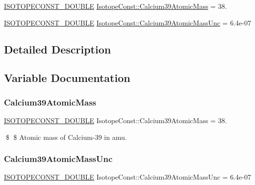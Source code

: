 \begin{DoxyCompactItemize}
\item 
\mbox{\hyperlink{group___isotope_const-_macros_ga8f45a7272ce02c0b4c65c44636ed719a}{I\+S\+O\+T\+O\+P\+E\+C\+O\+N\+S\+T\+\_\+\+D\+O\+U\+B\+LE}} \mbox{\hyperlink{group___isotope_const-_calcium-_ca39_ga70c11fbb9c2a9befa8720db8d4707d75}{Isotope\+Const\+::\+Calcium39\+Atomic\+Mass}} = 38.
\item 
\mbox{\hyperlink{group___isotope_const-_macros_ga8f45a7272ce02c0b4c65c44636ed719a}{I\+S\+O\+T\+O\+P\+E\+C\+O\+N\+S\+T\+\_\+\+D\+O\+U\+B\+LE}} \mbox{\hyperlink{group___isotope_const-_calcium-_ca39_ga46ec59820dc86943ce71c21367a13574}{Isotope\+Const\+::\+Calcium39\+Atomic\+Mass\+Unc}} = 6.\+4e-\/07
\end{DoxyCompactItemize}


\subsection{Detailed Description}


\subsection{Variable Documentation}
\mbox{\label{group___isotope_const-_calcium-_ca39_ga70c11fbb9c2a9befa8720db8d4707d75}} 
\subsubsection{\texorpdfstring{Calcium39\+Atomic\+Mass}{Calcium39AtomicMass}}
{\footnotesize\ttfamily \mbox{\hyperlink{group___isotope_const-_macros_ga8f45a7272ce02c0b4c65c44636ed719a}{I\+S\+O\+T\+O\+P\+E\+C\+O\+N\+S\+T\+\_\+\+D\+O\+U\+B\+LE}} Isotope\+Const\+::\+Calcium39\+Atomic\+Mass = 38.}

\$ \$ Atomic mass of Calcium-\/39 in amu. \mbox{\label{group___isotope_const-_calcium-_ca39_ga46ec59820dc86943ce71c21367a13574}} 
\subsubsection{\texorpdfstring{Calcium39\+Atomic\+Mass\+Unc}{Calcium39AtomicMassUnc}}
{\footnotesize\ttfamily \mbox{\hyperlink{group___isotope_const-_macros_ga8f45a7272ce02c0b4c65c44636ed719a}{I\+S\+O\+T\+O\+P\+E\+C\+O\+N\+S\+T\+\_\+\+D\+O\+U\+B\+LE}} Isotope\+Const\+::\+Calcium39\+Atomic\+Mass\+Unc = 6.\+4e-\/07}

